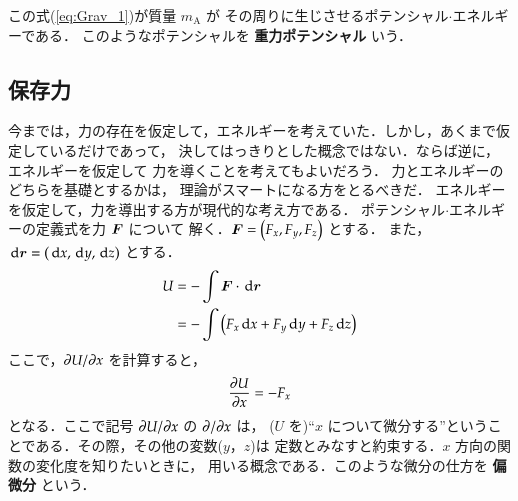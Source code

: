             この式(\ref{eq:Grav_1})が質量 $m_{\mathrm{A}}$ が
            その周りに生じさせるポテンシャル$\cdot$エネルギーである．
            このようなポテンシャルを \textbf{重力ポテンシャル} いう．

        \subsection{保存力}\label{PF}
                    今までは，力の存在を仮定して，エネルギーを考えていた．しかし，あくまで仮定しているだけであって，
                    決してはっきりとした概念ではない．ならば逆に，エネルギーを仮定して
                    力を導くことを考えてもよいだろう．
                    力とエネルギーのどちらを基礎とするかは，
                    理論がスマートになる方をとるべきだ．
                    エネルギーを仮定して，力を導出する方が現代的な考え方である．
                    ポテンシャル$\cdot$エネルギーの定義式を力 $\boldsymbol{F}$ について
                    解く．$\boldsymbol{F}=\left( F_{x}, F_{y},F_{z}\right)$ とする．
                    また，$\,\mathrm{d}\boldsymbol{r}=\left( \,\mathrm{d} x ,\,\mathrm{d} y ,\,\mathrm{d} z \right)$ とする．
                        \begin{align}
                            U &= -\int \boldsymbol{F}\cdot \,\mathrm{d}\boldsymbol{r} \notag \\
                              &= -\int \left( F_{x}\,\mathrm{d} x+F_{y}\,\mathrm{d} y+F_{z}\,\mathrm{d} z \right)
                        \end{align}
                    ここで，$\partial U/\partial x$ を計算すると，
                        \begin{align}
                            \frac{\partial U}{\partial x}=-F_{x}
                        \end{align}
                    となる．ここで記号 $\partial U/\partial x$ の $\partial/\partial x$ は，
                    ($U$ を)“$x$ について微分する”ということである．その際，その他の変数($y$，$z$)は
                    定数とみなすと約束する．$x$ 方向の関数の変化度を知りたいときに，
                    用いる概念である．このような微分の仕方を \textbf{偏微分} という．

